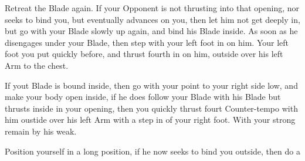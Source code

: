 \exercise{}


Retreat the Blade again. If your Opponent is not thrusting into that
opening, nor seeks to bind you, but eventually advances on you, then
let him not get deeply in, but go with your Blade slowly up again, and
bind his Blade inside. As soon as he disengages under your Blade, then
step with your left foot in on him. Your left foot you put quickly
before, and thrust fourth in on him, outside over his left Arm to the
chest.

\exercise{}


If yout Blade is bound inside, then go with your point to your right
side low, and make your body open inside, if he does follow your Blade
with his Blade but thrusts inside in your opening, then you quickly
thrust fourt Counter-tempo with him oustide over his left Arm with a
step in of your right foot. With your strong remain by his weak.



Position yourself in a long position, if he now seeks to bind you
outside, then do a
